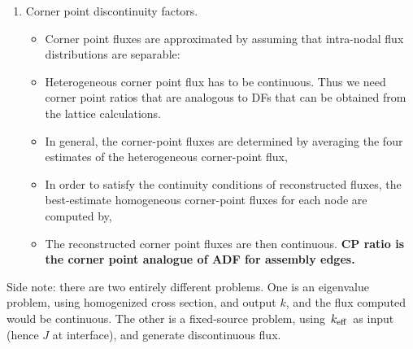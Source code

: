 \documentclass{school-22.211-notes}
\begin{document}
\begin{enumerate}
\begin{enumerate}
    \item Corner point discontinuity factors. 
      \begin{itemize}
      \item Corner point fluxes are approximated by assuming that intra-nodal flux distributions are separable: 
      \item Heterogeneous corner point flux has to be continuous. Thus we need corner point ratios that are analogous to DFs that can be obtained from the lattice calculations. 
      \item In general, the corner-point fluxes are determined by averaging the four estimates of the heterogeneous corner-point flux, 
      \item In order to satisfy the continuity conditions of reconstructed fluxes, the best-estimate homogeneous corner-point fluxes for each node are computed by, 
      \item  The reconstructed corner point fluxes are then continuous. \textbf{CP ratio is the corner point analogue of ADF for assembly edges.}
      \end{itemize}
  \end{enumerate}
  Side note: there are two entirely different problems. One is an eigenvalue problem, using homogenized cross section, and output $k$, and the flux computed would be continuous. The other is a fixed-source problem, using $\left. k_{\mathrm{eff}} \right.$ as input (hence $J$ at interface), and generate discontinuous flux. 
\end{enumerate}
\end{document}
